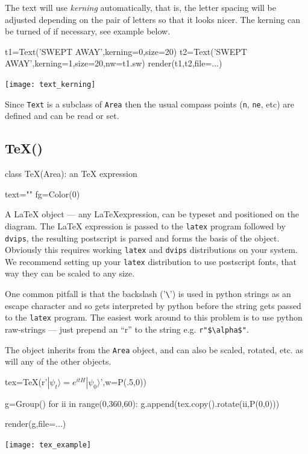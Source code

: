 \documentclass[a4paper]{book}
\begin{document}
The text will use \emph{kerning} automatically, that is, the
letter spacing will be adjusted depending on the pair of letters so
that it looks nicer. The kerning can be turned of if necessary, see
example below.
\begin{example}
\begin{python}
t1=Text('SWEPT AWAY',kerning=0,size=20)
t2=Text('SWEPT AWAY',kerning=1,size=20,nw=t1.sw)
render(t1,t2,file=...)
\end{python}
\begin{center}
  \texttt{[image: text\_kerning]}
\end{center}
\end{example}

Since \Verb|Text| is a subclass of \Verb|Area| then the usual compass points
(\Verb|n|, \Verb|ne|, etc) are defined and can be read or set.

\subsection{TeX()}
\label{sec:tex}
\begin{python}
class TeX(Area):
    an TeX expression

    text=""
    fg=Color(0)
\end{python}

A \LaTeX{} object --- any \LaTeX expression, can be typeset and
positioned on the diagram.  The \LaTeX{} expression is passed to the
\Verb|latex| program followed by \Verb|dvips|, the resulting
postscript is parsed and forms the basis of the object. Obviously this
requires working \Verb|latex| and \Verb|dvips| distributions on your
system. We recommend setting up your \Verb|latex| distribution to
use postscript fonts, that way they can be scaled to any size.

One common pitfall is that the backslash ('\Verb|\|') is used in python
strings as an escape character and so gets interpreted by python before
the string gets passed to the \Verb|latex| program. The easiest work
around to this problem is to use python raw-strings --- just prepend an
``r'' to the string e.g. \Verb|r"$\alpha$"|.

The object inherits from the \Verb|Area| object, and can also be
scaled, rotated, etc. as will any of the other objects.
\begin{example}
\begin{python}
tex=TeX(r'$|\psi_t\rangle=e^{itH}|\psi_0\rangle$',w=P(.5,0))

g=Group()
for ii in range(0,360,60):
    g.append(tex.copy().rotate(ii,P(0,0)))

render(g,file=...)
\end{python}
\begin{center}
  \texttt{[image: tex\_example]}
\end{center}
\end{example}
\end{document}
